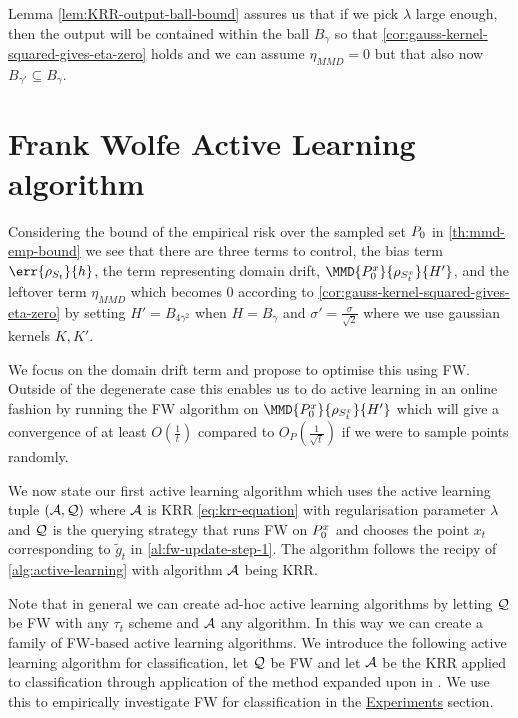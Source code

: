 Lemma \ref{lem:KRR-output-ball-bound} assures us that if we pick \(\lambda\)
large enough, then the output will be contained within the ball \(B_{\gamma}\)
so that \ref{cor:gauss-kernel-squared-gives-eta-zero} holds and we can assume
\(\eta_{MMD} = 0\) but that also now \(B_{\gamma'} \subseteq B_{\gamma}\).

\section{Frank Wolfe Active Learning algorithm}
Considering the bound of the empirical risk over the sampled set
\(P_{0}\) in \ref{th:mmd-emp-bound} we see that there are three terms to
control, the bias term \(\err{\rho_{\trainset_{t}}}{h}\), the term representing
domain drift, \(\MMD{\poolsetx_{0}}{\rho_{\trainsetx_{t}}}{H'}\), and the leftover term
\(\eta_{MMD}\) which becomes \(0\) according to
\ref{cor:gauss-kernel-squared-gives-eta-zero} by setting \(H' =
B_{4\gamma^{2}}\) when \(H = B_{\gamma}\) and \(\sigma' = \frac{\sigma}{\sqrt{2}}\) where we use gaussian kernels \(K, K'\).

We focus on the domain drift term and propose to optimise this using FW. Outside
of the degenerate case this enables us to do active learning in an online
fashion by running the FW algorithm on
\(\MMD{\poolsetx_{0}}{\rho_{\trainsetx_{t}}}{H'}\) which will give a convergence
of at least \(O(\frac{1}{t})\) compared to \(O_P(\frac{1}{\sqrt{t}})\) if we were
to sample points randomly.

We now state our first active learning algorithm which uses the active learning
tuple \((\mathcal{A}, \mathcal{Q})\) where \(\mathcal{A}\) is KRR \ref{eq:krr-equation} with regularisation
parameter \(\lambda\) and \(\mathcal{Q}\) is the querying strategy that runs FW on
\(P^x_{0}\) and chooses the point \(x_{t}\) corresponding to
\(\tilde{g}_{t}\) in \ref{al:fw-update-step-1}. The algorithm follows the recipy of
\ref{alg:active-learning} with algorithm \(\mathcal{A}\) being KRR.

Note that in general we can create ad-hoc active learning algorithms by letting
\(\mathcal{Q}\) be FW with any \(\tau_t\) scheme and \(\mathcal{A}\) any algorithm. In
this way we can create a family of FW-based active learning algorithms. We
introduce the following active learning algorithm for classification, let
\(\mathcal{Q}\) be FW and let \(\mathcal{A}\) be the KRR applied to classification
through application of the method expanded upon in \cite{ciliberto16}. We use
this to empirically investigate FW for classification in the
\hyperref[ch:experiments]{Experiments} section.

